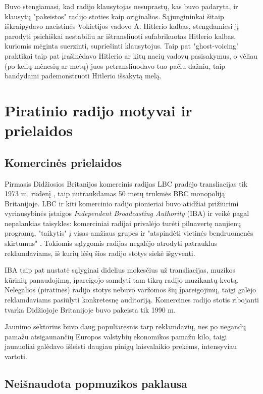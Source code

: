 \documentclass[kursinis-darbas]{vukf}
\begin{document}
Buvo stengiamasi, kad radijo klausytojas nesuprastų, kas buvo padaryta, ir klausytų "pakeistos" radijo stoties kaip originalios. Sąjungininkai šitaip iškraipydavo nacistinės Vokietijos vadovo A. Hitlerio kalbas, stengdamiesi jį parodyti psichiškai nestabiliu ar ištransliuoti sufabrikuotas Hitlerio kalbas, kuriomis mėginta suerzinti, supriešinti klausytojus. Taip pat "ghost-voicing" praktikai taip pat įrašinėdavo Hitlerio ar kitų nacių vadovų pasisakymus, o vėliau (po kelių mėnesių ar metų) juos petransliuodavo tuo pačiu dažniu, taip bandydami pademonstruoti Hitlerio išsakytą melą.


\section{Piratinio radijo motyvai ir prielaidos}

\subsection{Komercinės prielaidos}

Pirmasis Didžiosios Britanijos komercinis radijas LBC pradėjo transliacijas tik 1973 m. rudenį \cite{bbc_first_commercial_radio}, taip nutraukdamas 50 metų trukmės \gls{BBC} monopoliją Britanijoje. LBC ir kiti komercinio radijo pionieriai buvo atidžiai prižiūrimi vyriausybinės įstaigos \emph{Independent Broadcasting Authority} (IBA) ir veikė pagal nepalankias taisykles: komerciniai radijai privalėjo turėti pilnavertę naujienų programą, "taikytis" į visas amžiaus grupes ir "atspindėti vietinės bendruomenės skirtumus" \cite[p.~13]{cf_the_radio_handbook}. Tokiomis sąlygomis radijas negalėjo atrodyti patrauklus reklamdaviams, iš kurių lėšų šios radijo stotys siekė išgyventi.

IBA taip pat nustatė sąlyginai didelius mokesčius už transliacijas, muzikos kūrinių panaudojimą, įpareigojo samdyti tam tikrą radijo muzikantų kvotą. Nelegalios (piratinės) radijo stotys nebuvo varžomos šių įpareigojimų, taigi galėjo reklamdaviams pasiūlyti konkretesnę auditoriją. Komercines radijo stotis ribojanti tvarka Didžiojoje Britanijoje buvo pakeista tik 1990 m.

Jaunimo sektorius buvo daug populiaresnis tarp reklamdavių, nes po negandų pamažu atsigaunančių Europos valstybių ekonomikos pamažu kilo, taigi jaunuoliai galėdavo išleisti daugiau pinigų laisvalaikio prekėms, intensyviau vartoti.


\subsection{Neišnaudota popmuzikos paklausa}
\end{document}
